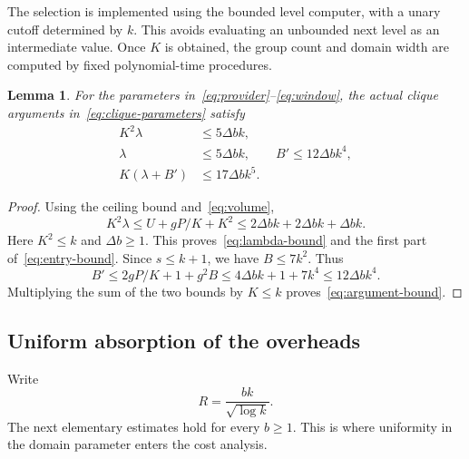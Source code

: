 \documentclass[11pt,reqno]{amsart}
\numberwithin{equation}{section}
\newtheorem{lemma}[theorem]{Lemma}
\theoremstyle{definition}
\theoremstyle{remark}
\begin{document}
The selection is implemented using the bounded level computer, with a unary cutoff determined by $k$. This avoids evaluating an unbounded next level as an intermediate value. Once $K$ is obtained, the group count and domain width are computed by fixed polynomial-time procedures.

\begin{lemma}\label{lem:parameters}
For the parameters in~\eqref{eq:provider}--\eqref{eq:window}, the actual clique arguments in~\eqref{eq:clique-parameters} satisfy
\begin{align}
 K^2\lambda&\le5\Delta bk,\label{eq:lambda-bound}\\
 \lambda&\le5\Delta bk,\qquad B'\le12\Delta bk^4,\label{eq:entry-bound}\\
 K(\lambda+B')&\le17\Delta bk^5.\label{eq:argument-bound}
\end{align}
\end{lemma}
\begin{proof}
Using the ceiling bound and~\eqref{eq:volume},
\[
 K^2\lambda\le U+gP/K+K^2
 \le2\Delta bk+2\Delta bk+\Delta bk.
\]
Here $K^2\le k$ and $\Delta b\ge1$. This proves~\eqref{eq:lambda-bound} and the first part of~\eqref{eq:entry-bound}. Since $s\le k+1$, we have $B\le7k^2$. Thus
\[
 B'\le2gP/K+1+g^2B
 \le4\Delta bk+1+7k^4
 \le12\Delta bk^4.
\]
Multiplying the sum of the two bounds by $K\le k$ proves~\eqref{eq:argument-bound}.
\end{proof}

\subsection{Uniform absorption of the overheads}

Write
\begin{equation}\label{eq:rate-R}
 R=\frac{bk}{\sqrt{\log k}}.
\end{equation}
The next elementary estimates hold for every $b\ge1$. This is where uniformity in the domain parameter enters the cost analysis.
\end{document}
